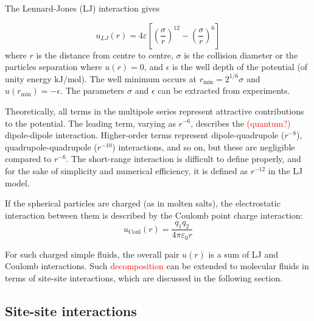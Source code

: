 The Lennard-Jones (LJ) interaction gives

\begin{equation}
u_{LJ}(r)=4\varepsilon\left[\left(\frac{\sigma}{r}\right)^{12}-\left(\frac{\sigma}{r}\right)^{6}\right]
\end{equation}
where $r$ is the distance from centre to centre, $\sigma$ is the
collision diameter or the particles separation where $u(r)=0$, and
$\epsilon$ is the well depth of the potential (of unity energy $\mathrm{kJ/mol}$).
The well minimum occurs at $r_{\min}=2^{1/6}\sigma$ and $u(r_{\min})=-\epsilon$.
The parameters $\sigma$ and $\epsilon$ can be extracted from experiments.

Theoretically, all terms in the multipole series represent attractive
contributions to the potential. The leading term, varying as $r^{-6}$,
describes the \textcolor{red}{(quantum?)} dipole-dipole interaction.
Higher-order terms represent dipole-quadrupole ($r^{-8}$), quadrupole-quadrupole
($r^{-10}$) interactions, and so on, but these are negligible compared
to $r^{-6}$. The short-range interaction is difficult to define properly,
and for the sake of simplicity and numerical efficiency, it is defined as $r^{-12}$
in the LJ model. 

If the spherical particles are charged (as in molten salts), the electrostatic
interaction between them is described by the Coulomb point charge
interaction:
\begin{equation}
u_{\mathrm{Coul}}(r)=\frac{q_{1}q_{2}}{4\pi\varepsilon_{0}r}
\end{equation}

For such charged simple fluids, the overall pair $u(r)$ is a sum
of LJ and Coulomb interactions. Such \textcolor{red}{decomposition}
can be extended to molecular fluids in terms of site-site interactions,
which are discussed in the following section.

\subsection{Site-site interactions}

